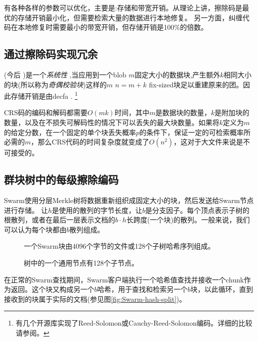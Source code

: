 有各种各样的参数可以优化，主要是:存储和带宽开销。从理论上讲，擦除码是最优的存储开销最小化，但需要检索大量的数据进行本地修复。
另一方面，纠缠代码在本地修复时需要最小的带宽开销，但存储开销是100\%的倍数。 

\subsection{通过擦除码实现冗余\statusgreen}\label{sec:erasure}


(今后 \cite{lubyetal1995CRS} \cite{plank2006optimizing})是一个\emph{系统性} ,当应用到一个blob $m$固定大小的数据块,产生额外$k$相同大小的块(所以称为\emph{奇偶校验块})这样的$m$ $n=m+k$ fix-sized块足以重建原来的团。因此存储开销是由decfa .%
%
\footnote{%
有几个开源库实现了Reed-Solomon或Cauchy-Reed-Solomon编码。详细的比较请参阅\cite{plank2009performance}。}

CRS码的编码和解码都需要$O(mk)$时间，其中$m$是数据块的数量，$k$是附加块的数量，以及在不损失可解码性的情况下可以丢失的最大块数量。如果将$k$定义为$m$的给定分数，在一个固定的单个块丢失概率$p$的条件下，保证一定的可检索概率所必需的$m$，那么CRS代码的时间复杂度就变成了$O(n^2)$，这对于大文件来说是不可接受的。 

\subsection{群块树中的每级擦除编码\statusgreen}

Swarm使用分层Merkle树\cite{merkle1980protocols}将数据重新组织成固定大小的块，然后发送给Swarm节点进行存储。
让$h$是使用的散列的字节长度，让$b$是分支因子。每个顶点表示子树的根散列，或者在最后一层表示文档的$b\cdot h$长跨度(一个块)的散列。一般来说，我们可以认为每个块都由$b$散列组成。


\begin{figure}[htbp]
   \centering
   
   \caption[群块\statusgreen]{一个Swarm块由4096个字节的文件或128个子树哈希序列组成。}
   \label{fig:chunk}
\end{figure}


\begin{figure}[htbp]
   \centering
   
   \caption[树中的一个通用节点有128个子\statusgreen]{树中的一个通用节点有128个子节点。}
   \label{fig:Swarm-hash-basic}
\end{figure}

在正常的Swarm查找期间，Swarm客户端执行一个哈希值查找并接收一个chunk作为返回。这个块又构成另一个$b$哈希，用于查找和检索另一个$b$块，以此循环，直到接收到的块属于实际的文档(参见图\ref{fig:Swarm-hash-split})。



